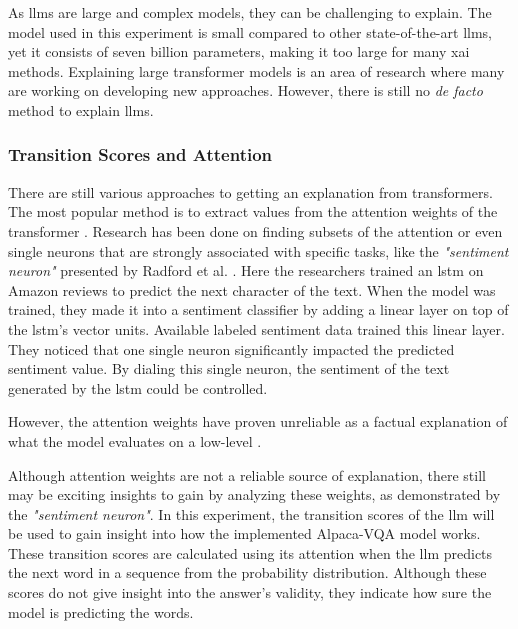        As \glspl{llm} are large and complex models, they can be challenging to explain. The model used in this experiment is small compared to other state-of-the-art \glspl{llm}, yet it consists of seven billion parameters, making it too large for many \gls{xai} methods. Explaining large transformer models is an area of research where many are working on developing new approaches. However, there is still no \textit{de facto} method to explain \glspl{llm}.

        \subsubsection{Transition Scores and Attention}
        There are still various approaches to getting an explanation from transformers. The most popular method is to extract values from the attention weights of the transformer \cite{cheferGenericAttentionModelExplainability2021, cheferTransformerInterpretabilityAttention2021, barkanGradSAMExplainingTransformers2021, bohleHolisticallyExplainableVision2023}. Research has been done on finding subsets of the attention or even single neurons that are strongly associated with specific tasks, like the \textit{"sentiment neuron"} presented by Radford et al. \cite{radfordLearningGenerateReviews2017}. Here the researchers trained an \gls{lstm} on Amazon reviews to predict the next character of the text. When the model was trained, they made it into a sentiment classifier by adding a linear layer on top of the \gls{lstm}'s vector units. Available labeled sentiment data trained this linear layer. They noticed that one single neuron significantly impacted the predicted sentiment value. By dialing this single neuron, the sentiment of the text generated by the \gls{lstm} could be controlled. 
        
        However, the attention weights have proven unreliable as a factual explanation of what the model evaluates on a low-level \cite{serranoAttentionInterpretable2019, jainAttentionNotExplanation2019, abnarQuantifyingAttentionFlow2020}. 

        Although attention weights are not a reliable source of explanation, there still may be exciting insights to gain by analyzing these weights, as demonstrated by the \textit{"sentiment neuron"}.
        In this experiment, the transition scores of the \gls{llm} will be used to gain insight into how the implemented Alpaca-VQA model works. 
        These transition scores are calculated using its attention when the \gls{llm} predicts the next word in a sequence from the probability distribution. Although these scores do not give insight into the answer's validity, they indicate how sure the model is predicting the words.  


